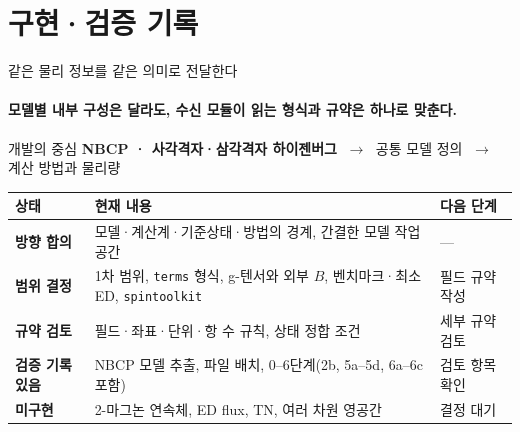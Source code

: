 \section[부록 A. 구현·검증 기록]{구현·검증 기록}

\begin{frame}[plain,label=section-appendix-a]
  \hypertarget{appendix-a}{}
  \renewcommand{\insertsectionnumber}{A}
  \sectionpage
\end{frame}

\begin{frame}[label=current-status]{같은 물리 정보를 같은 의미로 전달한다}
  \framesubtitle{모델별 내부 구성은 달라도, 수신 모듈이 읽는 형식과 규약은 하나로 맞춘다.}
  \begin{block}{개발의 중심}
    \textbf{NBCP · 사각격자·삼각격자 하이젠버그}
    $\;\longrightarrow\;$ 공통 모델 정의
    $\;\longrightarrow\;$ 계산 방법과 물리량
  \end{block}
  \medskip
  \begin{tabularx}{\textwidth}{@{}p{2.1cm}Yp{2.55cm}@{}}
    \toprule
    상태 & 현재 내용 & 다음 단계 \\
    \midrule
    \textbf{방향 합의} & 모델·계산계·기준상태·방법의 경계, 간결한 모델 작업 공간 & — \\
    \textbf{범위 결정} & 1차 범위, \texttt{terms} 형식, g-텐서와 외부 $B$, 벤치마크·최소 ED, \texttt{spintoolkit} & 필드 규약 작성 \\
    \textbf{규약 검토} & 필드·좌표·단위·항 수 규칙, 상태 정합 조건 & 세부 규약 검토 \\
    \textbf{검증 기록 있음} & NBCP 모델 추출, 파일 배치, 0--6단계(2b, 5a--5d, 6a--6c 포함) & 검토 항목 확인 \\
    \textbf{미구현} & 2-마그논 연속체, ED flux, TN, 여러 차원 영공간 & 결정 대기 \\
    \bottomrule
  \end{tabularx}
\end{frame}

